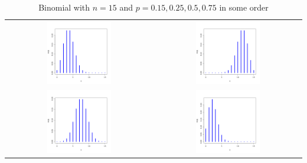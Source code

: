 \begin{table}[h]  
  \begin{tabular}{cc} 
    \includegraphics[width=0.45\textwidth]{images/binom15P25.png} & 
    \includegraphics[width=0.45\textwidth]{images/binom15P75.png} \\
     \includegraphics[width=0.45\textwidth]{images/binom15P5.png} & 
    \includegraphics[width=0.45\textwidth]{images/binom15P15.png} \\
  \end{tabular}
 \caption{\label{binpics} Binomial with $n=15$ and $p=0.15, 0.25, 0.5, 0.75$ in some order}
\end{table}


